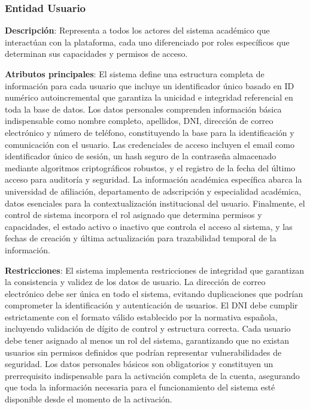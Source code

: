 \documentclass[12pt,a4paper,oneside]{report}
\begin{document}
\subsubsection{Entidad Usuario}\label{entidad-usuario}

\textbf{Descripción}: Representa a todos los actores del sistema académico que interactúan con la plataforma, cada uno diferenciado por roles específicos que determinan sus capacidades y permisos de acceso.

\textbf{Atributos principales}: El sistema define una estructura completa de información para cada usuario que incluye un identificador único basado en ID numérico autoincremental que garantiza la unicidad e integridad referencial en toda la base de datos. Los datos personales comprenden información básica indispensable como nombre completo, apellidos, DNI, dirección de correo electrónico y número de teléfono, constituyendo la base para la identificación y comunicación con el usuario. Las credenciales de acceso incluyen el email como identificador único de sesión, un hash seguro de la contraseña almacenado mediante algoritmos criptográficos robustos, y el registro de la fecha del último acceso para auditoría y seguridad. La información académica específica abarca la universidad de afiliación, departamento de adscripción y especialidad académica, datos esenciales para la contextualización institucional del usuario. Finalmente, el control de sistema incorpora el rol asignado que determina permisos y capacidades, el estado activo o inactivo que controla el acceso al sistema, y las fechas de creación y última actualización para trazabilidad temporal de la información.

\textbf{Restricciones}: El sistema implementa restricciones de integridad que garantizan la consistencia y validez de los datos de usuario. La dirección de correo electrónico debe ser única en todo el sistema, evitando duplicaciones que podrían comprometer la identificación y autenticación de usuarios. El DNI debe cumplir estrictamente con el formato válido establecido por la normativa española, incluyendo validación de dígito de control y estructura correcta. Cada usuario debe tener asignado al menos un rol del sistema, garantizando que no existan usuarios sin permisos definidos que podrían representar vulnerabilidades de seguridad. Los datos personales básicos son obligatorios y constituyen un prerrequisito indispensable para la activación completa de la cuenta, asegurando que toda la información necesaria para el funcionamiento del sistema esté disponible desde el momento de la activación.
\end{document}
